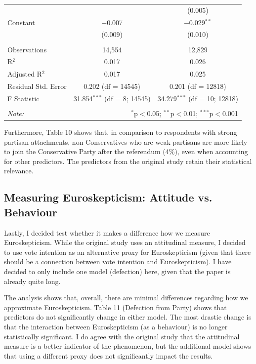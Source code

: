 \documentclass[12pt,letterpaper]{article}
\begin{document}
\begin{table}[H]
{\begin{tabular}{@{\extracolsep{5pt}}lcc}
				&  & (0.005) \\ 
				Constant & $-$0.007 & $-$0.029$^{**}$ \\ 
				& (0.009) & (0.010) \\ 
				\hline \\[-1.8ex] 
				Observations & 14,554 & 12,829 \\ 
				R$^{2}$ & 0.017 & 0.026 \\ 
				Adjusted R$^{2}$ & 0.017 & 0.025 \\ 
				Residual Std. Error & 0.202 (df = 14545) & 0.201 (df = 12818) \\ 
				F Statistic & 31.854$^{***}$ (df = 8; 14545) & 34.279$^{***}$ (df = 10; 12818) \\ 
				\hline 
				\hline \\[-1.8ex] 
				\textit{Note:}  & \multicolumn{2}{r}{$^{*}$p$<$0.05; $^{**}$p$<$0.01; $^{***}$p$<$0.001} \\ 
			\end{tabular} 
		}
	\end{table}
	
	Furthermore, Table 10 shows that, in comparison to respondents with strong partisan attachments, non-Conservatives who are weak partisans are more likely to join the Conservative Party after the referendum (4\%), even when accounting for other predictors. The predictors from the original study retain their statistical relevance. 
	
	\subsection{Measuring Euroskepticism: Attitude vs. Behaviour}
	Lastly, I decided test whether it makes a difference how we measure Euroskepticism. While the original study uses an attitudinal measure, I decided to use vote intention as an alternative proxy for Euroskepticism (given that there should be a connection between vote intention and Euroskepticism). I have decided to only include one model (defection) here, given that the paper is already quite long. 
	
	The analysis shows that, overall, there are minimal differences regarding how we approximate Euroskepticism. Table 11 (Defection from Party) shows that predictors do not significantly change in either model. The most drastic change is that the interaction between Euroskepticism (as a behaviour) is no longer statistically significant. I do agree with the original study that the attitudinal measure is a better indicator of the phenomenon, but the additional model shows that using a different proxy does not significantly impact the results. 
	
\end{document}
